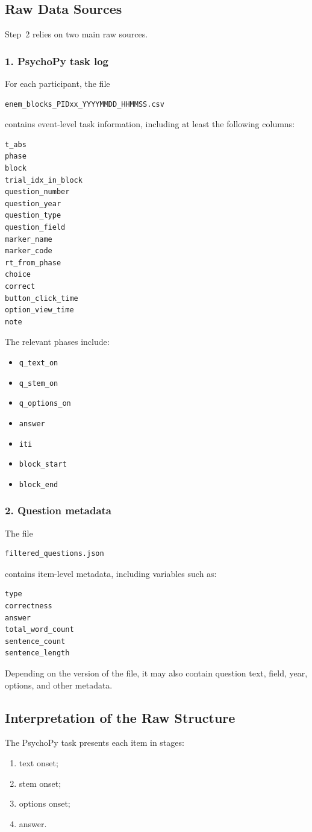 \documentclass[11pt]{article}
\begin{document}
\subsection{Raw Data Sources}
Step~2 relies on two main raw sources.

\subsubsection*{1. PsychoPy task log}
For each participant, the file
\begin{verbatim}
enem_blocks_PIDxx_YYYYMMDD_HHMMSS.csv
\end{verbatim}
contains event-level task information, including at least the following columns:
\begin{verbatim}
t_abs
phase
block
trial_idx_in_block
question_number
question_year
question_type
question_field
marker_name
marker_code
rt_from_phase
choice
correct
button_click_time
option_view_time
note
\end{verbatim}

The relevant phases include:
\begin{itemize}
    \item \texttt{q\_text\_on}
    \item \texttt{q\_stem\_on}
    \item \texttt{q\_options\_on}
    \item \texttt{answer}
    \item \texttt{iti}
    \item \texttt{block\_start}
    \item \texttt{block\_end}
\end{itemize}

\subsubsection*{2. Question metadata}
The file
\begin{verbatim}
filtered_questions.json
\end{verbatim}
contains item-level metadata, including variables such as:
\begin{verbatim}
type
correctness
answer
total_word_count
sentence_count
sentence_length
\end{verbatim}

Depending on the version of the file, it may also contain question text, field, year, options, and other metadata.

\subsection{Interpretation of the Raw Structure}
The PsychoPy task presents each item in stages:
\begin{enumerate}
    \item text onset;
    \item stem onset;
    \item options onset;
    \item answer.
\end{enumerate}
\end{document}
